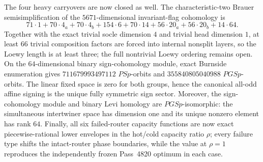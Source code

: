 The four heavy carryovers are now closed as well.  The characteristic-two Brauer semisimplification of the $5671$-dimensional invariant-flag cohomology is
\[
71\cdot1+70\cdot4_a+70\cdot4_b+154\cdot6+70\cdot14+56\cdot20_a+56\cdot20_b+14\cdot64.
\]
Together with the exact trivial socle dimension $4$ and trivial head dimension $1$, at least $66$ trivial composition factors are forced into internal nonsplit layers, so the Loewy length is at least three; the full nontrivial Loewy ordering remains open.  On the $64$-dimensional binary sign-cohomology module, exact Burnside enumeration gives $711679993497112$ $PSp$-orbits and $355840805040988$ $PGSp$-orbits.  The linear fixed space is zero for both groups, hence the canonical all-odd affine signing is the unique fully symmetric sign sector.  Moreover, the sign-cohomology module and binary Levi homology are $PGSp$-isomorphic: the simultaneous intertwiner space has dimension one and its unique nonzero element has rank $64$.  Finally, all six failed-router capacity functions are now exact piecewise-rational lower envelopes in the hot/cold capacity ratio $\rho$; every failure type shifts the intact-router phase boundaries, while the value at $\rho=1$ reproduces the independently frozen Pass~4820 optimum in each case.
